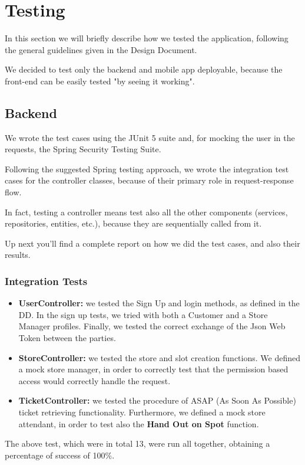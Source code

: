 \documentclass[table, 12pt]{article}
\begin{document}
\section{Testing}
\label{testing}
In this section we will briefly describe how we tested the application, following the general guidelines given in the Design Document.

We decided to test only the backend and mobile app deployable, because the front-end can be easily tested "by seeing it working".
\subsection{Backend}
We wrote the test cases using the JUnit 5 suite and, for mocking the user in the requests, the Spring Security Testing Suite.

Following the suggested Spring testing approach, we wrote the integration test cases for the controller classes, because of their primary role in request-response flow.

In fact, testing a controller means test also all the other components (services, repositories, entities, etc.), because they are sequentially called from it.

Up next you'll find a complete report on how we did the test cases, and also their results.

\subsubsection*{Integration Tests}
\begin{itemize}
    \item \textbf{UserController:} we tested the Sign Up and login methods, as defined in the DD. In the sign up tests, we tried with both a Customer and a Store Manager profiles. Finally, we tested the correct exchange of the Json Web Token between the parties.
    \item \textbf{StoreController:} we tested the store and slot creation functions. We defined a mock store manager, in order to correctly test that the permission based access would correctly handle the request.
    \item \textbf{TicketController:} we tested the procedure of ASAP (As Soon As Possible) ticket retrieving functionality. Furthermore, we defined a mock store attendant, in order to test also the \textbf{Hand Out on Spot} function.
\end{itemize}

The above test, which were in total 13, were run all together, obtaining a percentage of success of 100\%.
\end{document}
